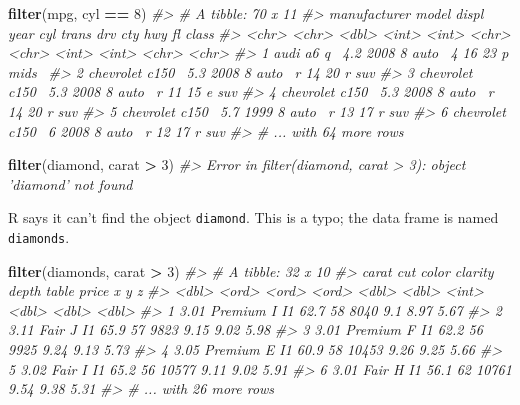 \documentclass[]{book}
\newenvironment{Shaded}{\begin{snugshade}}{\end{snugshade}}
\newcommand{\CommentTok}[1]{\textcolor[rgb]{0.56,0.35,0.01}{\textit{#1}}}
\newcommand{\DecValTok}[1]{\textcolor[rgb]{0.00,0.00,0.81}{#1}}
\newcommand{\KeywordTok}[1]{\textcolor[rgb]{0.13,0.29,0.53}{\textbf{#1}}}
\newcommand{\NormalTok}[1]{#1}
\newcommand{\OperatorTok}[1]{\textcolor[rgb]{0.81,0.36,0.00}{\textbf{#1}}}
\newcommand{\StringTok}[1]{\textcolor[rgb]{0.31,0.60,0.02}{#1}}
\theoremstyle{plain}
\theoremstyle{remark}
\theoremstyle{definition}
\theoremstyle{definition}
\theoremstyle{definition}
\theoremstyle{remark}
\begin{document}
\begin{Shaded}
\begin{Highlighting}[]
\KeywordTok{filter}\NormalTok{(mpg, cyl }\OperatorTok{==}\StringTok{ }\DecValTok{8}\NormalTok{)}
\CommentTok{#> # A tibble: 70 x 11}
\CommentTok{#>   manufacturer model displ  year   cyl trans drv     cty   hwy fl    class}
\CommentTok{#>   <chr>        <chr> <dbl> <int> <int> <chr> <chr> <int> <int> <chr> <chr>}
\CommentTok{#> 1 audi         a6 q~   4.2  2008     8 auto~ 4        16    23 p     mids~}
\CommentTok{#> 2 chevrolet    c150~   5.3  2008     8 auto~ r        14    20 r     suv  }
\CommentTok{#> 3 chevrolet    c150~   5.3  2008     8 auto~ r        11    15 e     suv  }
\CommentTok{#> 4 chevrolet    c150~   5.3  2008     8 auto~ r        14    20 r     suv  }
\CommentTok{#> 5 chevrolet    c150~   5.7  1999     8 auto~ r        13    17 r     suv  }
\CommentTok{#> 6 chevrolet    c150~   6    2008     8 auto~ r        12    17 r     suv  }
\CommentTok{#> # ... with 64 more rows}
\end{Highlighting}
\end{Shaded}

\begin{Shaded}
\begin{Highlighting}[]
\KeywordTok{filter}\NormalTok{(diamond, carat }\OperatorTok{>}\StringTok{ }\DecValTok{3}\NormalTok{)}
\CommentTok{#> Error in filter(diamond, carat > 3): object 'diamond' not found}
\end{Highlighting}
\end{Shaded}

R says it can't find the object \texttt{diamond}. This is a typo; the
data frame is named \texttt{diamonds}.

\begin{Shaded}
\begin{Highlighting}[]
\KeywordTok{filter}\NormalTok{(diamonds, carat }\OperatorTok{>}\StringTok{ }\DecValTok{3}\NormalTok{)}
\CommentTok{#> # A tibble: 32 x 10}
\CommentTok{#>   carat cut     color clarity depth table price     x     y     z}
\CommentTok{#>   <dbl> <ord>   <ord> <ord>   <dbl> <dbl> <int> <dbl> <dbl> <dbl>}
\CommentTok{#> 1  3.01 Premium I     I1       62.7    58  8040  9.1   8.97  5.67}
\CommentTok{#> 2  3.11 Fair    J     I1       65.9    57  9823  9.15  9.02  5.98}
\CommentTok{#> 3  3.01 Premium F     I1       62.2    56  9925  9.24  9.13  5.73}
\CommentTok{#> 4  3.05 Premium E     I1       60.9    58 10453  9.26  9.25  5.66}
\CommentTok{#> 5  3.02 Fair    I     I1       65.2    56 10577  9.11  9.02  5.91}
\CommentTok{#> 6  3.01 Fair    H     I1       56.1    62 10761  9.54  9.38  5.31}
\CommentTok{#> # ... with 26 more rows}
\end{Highlighting}
\end{Shaded}
\end{document}
